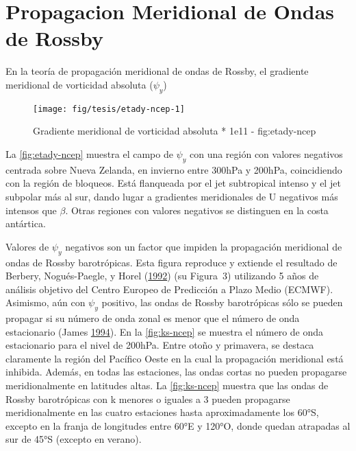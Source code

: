 \documentclass[spanish,a4paper,12p]{book}
\begin{document}
\section{Propagacion Meridional de Ondas de
Rossby}\label{propagacion-meridional-de-ondas-de-rossby}

En la teoría de propagación meridional de ondas de Rossby, el gradiente
meridional de vorticidad absoluta (\(\psi_y\))

\begin{landscape}\begin{figure}

{\centering \texttt{[image: fig/tesis/etady-ncep-1]} 

}

\caption{Gradiente meridional de vorticidad absoluta * 1e11 - fig:etady-ncep}\label{fig:etady-ncep}
\end{figure}
\end{landscape}

La \autoref{fig:etady-ncep} muestra el campo de \(\psi_y\) con una
región con valores negativos centrada sobre Nueva Zelanda, en invierno
entre 300hPa y 200hPa, coincidiendo con la región de bloqueos. Está
flanqueada por el jet subtropical intenso y el jet subpolar más al sur,
dando lugar a gradientes meridionales de U negativos más intensos que
\(\beta\). Otras regiones con valores negativos se distinguen en la
costa antártica.

Valores de \(\psi_y\) negativos son un factor que impiden la propagación
meridional de ondas de Rossby barotrópicas. Esta figura reproduce y
extiende el resultado de Berbery, Nogués-Paegle, y Horel
(\protect\hyperlink{ref-Berbery1992}{1992}) (su Figura~3) utilizando 5
años de análisis objetivo del Centro Europeo de Predicción a Plazo Medio
(ECMWF). Asimismo, aún con \(\psi_y\) positivo, las ondas de Rossby
barotrópicas sólo se pueden propagar si su número de onda zonal es menor
que el número de onda estacionario (James
\protect\hyperlink{ref-James}{1994}). En la \autoref{fig:ks-ncep} se
muestra el número de onda estacionario para el nivel de 200hPa. Entre
otoño y primavera, se destaca claramente la región del Pacífico Oeste en
la cual la propagación meridional está inhibida. Además, en todas las
estaciones, las ondas cortas no pueden propagarse meridionalmente en
latitudes altas. La \autoref{fig:ks-ncep} muestra que las ondas de
Rossby barotrópicas con k menores o iguales a 3 pueden propagarse
meridionalmente en las cuatro estaciones hasta aproximadamente los 60°S,
excepto en la franja de longitudes entre 60°E y 120°O, donde quedan
atrapadas al sur de 45°S (excepto en verano).
\end{document}
